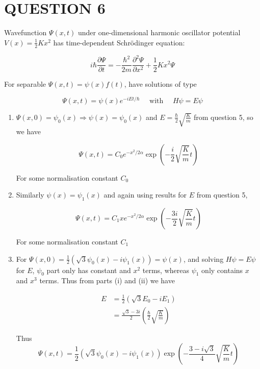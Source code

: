 \documentclass[a4paper]{article}
\begin{document}
\section{QUESTION 6}

Wavefunction $ \Psi(x,t) $ under one-dimensional harmonic oscillator potential $ V(x) = \frac{1}{2}Kx^{2} $ has time-dependent Schr\"odinger equation:

\[ i \hbar \frac{\partial \Psi }{\partial t} = - \frac{\hbar^{2}}{2m} \frac{\partial^{2} \Psi }{\partial x^{2}} + \frac{1}{2}Kx^{2} \Psi \]

For separable $ \Psi(x,t) = \psi(x)f(t) $, have solutions of type

\[ \Psi(x,t) = \psi(x)e^{-iEt/\hbar} \quad \text{ with } \quad H \psi = E \psi \]

\begin{enumerate}
	\item $ \Psi(x,0) = \psi_{0}(x) \Rightarrow \psi(x) = \psi_{0}(x)$ and $ E = \frac{\hbar}{2}\sqrt{\frac{K}{m}} $ from question 5, so we have 
	
	\[ \Psi(x,t) = C_{0} e^{-x^{2}/2\alpha} \exp\left( - \frac{i}{2}\sqrt{\frac{K}{m}} t \right)  \] 
	
	For some normalisation constant $ C_{0} $
	
	\item Similarly $ \psi(x) = \psi_{1}(x) $ and again using results for $ E $ from question 5,
	
	\[ \Psi(x,t) = C_{1} x e^{-x^{2}/2\alpha} \exp\left( - \frac{3i}{2}\sqrt{\frac{K}{m}} t \right)  \] 
	
	For some normalisation constant $ C_{1} $
	
	\item For $ \Psi(x,0)  = \frac{1}{2}  ( \sqrt{3} \psi_{0}(x) - i \psi_{1}(x)) = \psi(x) $, and solving $ H \psi = E \psi $ for $ E $, $ \psi_{0} $ part only has constant and $ x^{2} $ terms, whereas $ \psi_{1} $ only contains $ x $ and $ x^{3} $ terms. Thus from parts (i) and (ii) we have
	
	
	\begin{align*}
	E & = \frac{1}{2}(\sqrt{3} E_{0} - i E_{1} )  \\
	& = \frac{\sqrt{3} - 3i}{2} \left( \frac{\hbar}{2} \sqrt{\frac{K}{m}} \right) 
	\end{align*}
	
	Thus \[ \Psi(x,t) =  \frac{1}{2}  ( \sqrt{3} \psi_{0}(x) - i \psi_{1}(x)) \exp \left( - \frac{3 - i\sqrt{3}}{4} \sqrt{\frac{K}{m}} t   \right)  \]
 	
\end{enumerate}
\end{document}

